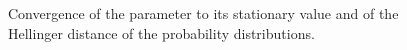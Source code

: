 \begin{figure}[t]
	\centering
	\begin{subfigure}{0.49\linewidth}
		\centering
		\resizebox{1.0\linewidth}{!}{}
	\end{subfigure}
	\begin{subfigure}{0.49\linewidth}
		\centering
		\resizebox{1.0\linewidth}{!}{}
	\end{subfigure}
	\caption{Convergence of the parameter to its stationary value and of the Hellinger distance of the probability distributions.}
	\label{fig:ConvergenceMCMC}
\end{figure}


